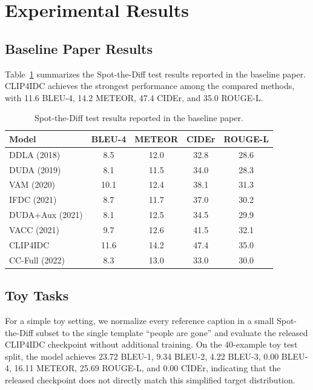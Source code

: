 \section{Experimental Results}
\label{section:exp}

\subsection{Baseline Paper Results}
\label{section:exp:baseline}

Table~\ref{tab:spot-baseline-results} summarizes the Spot-the-Diff test results reported in the baseline paper. CLIP4IDC achieves the strongest performance among the compared methods, with 11.6 BLEU-4, 14.2 METEOR, 47.4 CIDEr, and 35.0 ROUGE-L.

\begin{table}[t]
\centering
\caption{Spot-the-Diff test results reported in the baseline paper.}
\label{tab:spot-baseline-results}
\begin{tabular}{lcccc}
\hline
Model & BLEU-4 & METEOR & CIDEr & ROUGE-L \\
\hline
DDLA (2018) & 8.5 & 12.0 & 32.8 & 28.6 \\
DUDA (2019) & 8.1 & 11.5 & 34.0 & 28.3 \\
VAM (2020) & 10.1 & 12.4 & 38.1 & 31.3 \\
IFDC (2021) & 8.7 & 11.7 & 37.0 & 30.2 \\
DUDA+Aux (2021) & 8.1 & 12.5 & 34.5 & 29.9 \\
VACC (2021) & 9.7 & 12.6 & 41.5 & 32.1 \\
CLIP4IDC & 11.6 & 14.2 & 47.4 & 35.0 \\
CC-Full (2022) & 8.3 & 13.0 & 33.0 & 30.0 \\
\hline
\end{tabular}
\end{table}

\subsection{Toy Tasks}
\label{section:exp:toy}

For a simple toy setting, we normalize every reference caption in a small Spot-the-Diff subset to the single template ``people are gone'' and evaluate the released CLIP4IDC checkpoint without additional training. On the 40-example toy test split, the model achieves 23.72 BLEU-1, 9.34 BLEU-2, 4.22 BLEU-3, 0.00 BLEU-4, 16.11 METEOR, 25.69 ROUGE-L, and 0.00 CIDEr, indicating that the released checkpoint does not directly match this simplified target distribution.

